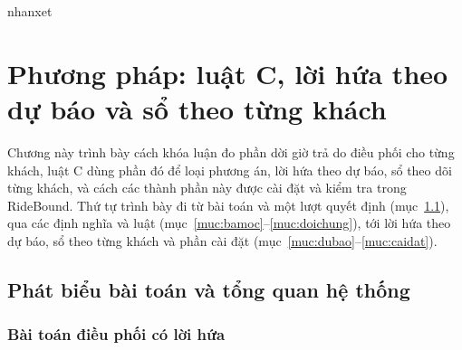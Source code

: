 
\ifcsname nhanxet\endcsname\else
  \theoremstyle{definition}
  \newtheorem{nhanxet}{Nhận xét}[chapter]
\fi

\chapter{Phương pháp: luật C, lời hứa theo dự báo và sổ theo từng khách}
\label{chuong:phuongphap}

Chương này trình bày cách khóa luận đo phần dời giờ trả do điều phối cho từng khách, luật C dùng phần
đó để loại phương án, lời hứa theo dự báo, sổ theo dõi từng khách, và cách các thành phần này được cài
đặt và kiểm tra trong RideBound. Thứ tự trình bày đi từ bài toán và một lượt quyết định
(mục~\ref{muc:baitoan}), qua các định nghĩa và luật (mục~\ref{muc:bamoc}--\ref{muc:doichung}), tới lời
hứa theo dự báo, sổ theo từng khách và phần cài đặt (mục~\ref{muc:dubao}--\ref{muc:caidat}).

\section{Phát biểu bài toán và tổng quan hệ thống}
\label{muc:baitoan}

\subsection{Bài toán điều phối có lời hứa}
\label{muc:baitoan-phatbieu}

